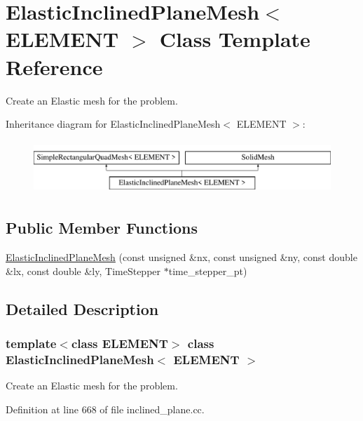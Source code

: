 \hypertarget{classElasticInclinedPlaneMesh}{}\section{Elastic\+Inclined\+Plane\+Mesh$<$ E\+L\+E\+M\+E\+NT $>$ Class Template Reference}
\label{classElasticInclinedPlaneMesh}


Create an Elastic mesh for the problem.  


Inheritance diagram for Elastic\+Inclined\+Plane\+Mesh$<$ E\+L\+E\+M\+E\+NT $>$\+:\begin{figure}[H]
\begin{center}
\leavevmode
\includegraphics[height=2.000000cm]{classElasticInclinedPlaneMesh}
\end{center}
\end{figure}
\subsection*{Public Member Functions}
\begin{DoxyCompactItemize}
\item 
\hyperlink{classElasticInclinedPlaneMesh_a61ba6d852505dd1353e791223fdfce04}{Elastic\+Inclined\+Plane\+Mesh} (const unsigned \&nx, const unsigned \&ny, const double \&lx, const double \&ly, Time\+Stepper $\ast$time\+\_\+stepper\+\_\+pt)
\end{DoxyCompactItemize}


\subsection{Detailed Description}
\subsubsection*{template$<$class E\+L\+E\+M\+E\+NT$>$\newline
class Elastic\+Inclined\+Plane\+Mesh$<$ E\+L\+E\+M\+E\+N\+T $>$}

Create an Elastic mesh for the problem. 

Definition at line 668 of file inclined\+\_\+plane.\+cc.



